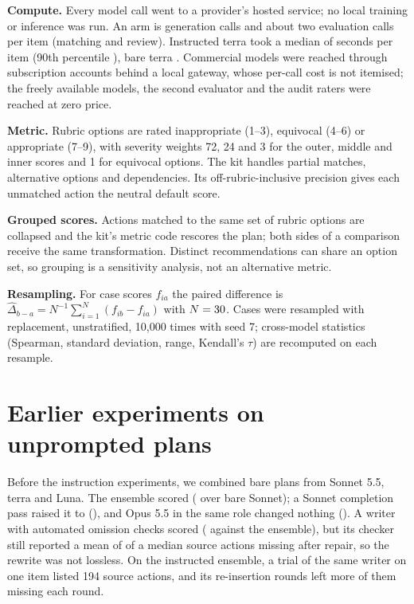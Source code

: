 \documentclass[11pt]{article}
\begin{document}
\textbf{Compute.} Every model call went to a provider's hosted service; no local training or
inference was run. An arm is \nItems{} generation calls and about two evaluation calls per item
(matching and review). Instructed terra took a median of \covRuntimeTerraSpec{} seconds per item
(90th percentile \covRuntimePninetyTerraSpec{}), bare terra \covRuntimeTerraBare{}. Commercial
models were reached through subscription accounts behind a local gateway, whose per-call cost is not
itemised; the freely available models, the second evaluator and the audit raters were reached at
zero price.

\textbf{Metric.} Rubric options are rated inappropriate (1--3), equivocal (4--6) or appropriate
(7--9), with severity weights 72, 24 and 3 for the outer, middle and inner scores and 1 for
equivocal options. The kit handles partial matches, alternative options and dependencies. Its
off-rubric-inclusive precision gives each unmatched action the neutral default score.

\textbf{Grouped scores.} Actions matched to the same set of rubric options are collapsed and the
kit's metric code rescores the plan; both sides of a comparison receive the same transformation.
Distinct recommendations can share an option set, so grouping is a sensitivity analysis, not an
alternative metric.

\textbf{Resampling.} For case scores $f_{ia}$ the paired difference is
$\widehat{\Delta}_{b-a} = N^{-1}\sum_{i=1}^{N}(f_{ib}-f_{ia})$ with $N=30$. Cases were
resampled with replacement, unstratified, 10,000 times with seed 7; cross-model statistics
(Spearman, standard deviation, range, Kendall's $\tau$) are recomputed on each resample.

\section{Earlier experiments on unprompted plans}
\label{app:earlier}
Before the instruction experiments, we combined bare plans from Sonnet 5.5, terra and Luna. The
ensemble scored \covFUnionBare{} (\covDUnionBareVsSonnet{} over bare Sonnet); a Sonnet completion
pass raised it to \covFGap{} (\covDGapVsUnion{}), and Opus 5.5 in the same role changed nothing
(\covDOpusVsSonnetGap{}). A writer with automated omission checks scored \covFWriterBare{}
(\covDWriterVsUnion{} against the ensemble), but its checker still reported a mean of
\covMissingFinalMean{} of a median \covSourceActionsMedian{} source actions missing after repair,
so the rewrite was not lossless. On the instructed ensemble, a trial of the same writer on one
item listed 194 source actions, and its re-insertion rounds left more of them missing each round.
\end{document}
